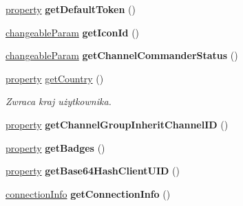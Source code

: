 \begin{DoxyCompactItemize}
\item 
\hyperlink{struct_ts3_api_1_1_client_1_1property}{property} {\bfseries get\+Default\+Token} ()\hypertarget{class_ts3_api_1_1_client_ae732cc011b882c77350de6ce99fbd3a0}{}\label{class_ts3_api_1_1_client_ae732cc011b882c77350de6ce99fbd3a0}

\item 
\hyperlink{struct_ts3_api_1_1_client_1_1changeable_param}{changeable\+Param} {\bfseries get\+Icon\+Id} ()\hypertarget{class_ts3_api_1_1_client_a130b1601b40d9e2062d767aa6c68c42d}{}\label{class_ts3_api_1_1_client_a130b1601b40d9e2062d767aa6c68c42d}

\item 
\hyperlink{struct_ts3_api_1_1_client_1_1changeable_param}{changeable\+Param} {\bfseries get\+Channel\+Commander\+Status} ()\hypertarget{class_ts3_api_1_1_client_a6387e63b888385926fee0c8c98fbdbde}{}\label{class_ts3_api_1_1_client_a6387e63b888385926fee0c8c98fbdbde}

\item 
\hyperlink{struct_ts3_api_1_1_client_1_1property}{property} \hyperlink{class_ts3_api_1_1_client_a7aea0d7be0c13772bf0cbcfe435d5b35}{get\+Country} ()\hypertarget{class_ts3_api_1_1_client_a7aea0d7be0c13772bf0cbcfe435d5b35}{}\label{class_ts3_api_1_1_client_a7aea0d7be0c13772bf0cbcfe435d5b35}

\begin{DoxyCompactList}\small\item\em Zwraca kraj użytkownika. \end{DoxyCompactList}\item 
\hyperlink{struct_ts3_api_1_1_client_1_1property}{property} {\bfseries get\+Channel\+Group\+Inherit\+Channel\+ID} ()\hypertarget{class_ts3_api_1_1_client_a7ca8f8068c190499d056c49496cdb2e8}{}\label{class_ts3_api_1_1_client_a7ca8f8068c190499d056c49496cdb2e8}

\item 
\hyperlink{struct_ts3_api_1_1_client_1_1property}{property} {\bfseries get\+Badges} ()\hypertarget{class_ts3_api_1_1_client_a13b167d84730f97ef069395d58bb2b24}{}\label{class_ts3_api_1_1_client_a13b167d84730f97ef069395d58bb2b24}

\item 
\hyperlink{struct_ts3_api_1_1_client_1_1property}{property} {\bfseries get\+Base64\+Hash\+Client\+U\+ID} ()\hypertarget{class_ts3_api_1_1_client_aea48dfe6fed2db31878bfb46093f315d}{}\label{class_ts3_api_1_1_client_aea48dfe6fed2db31878bfb46093f315d}

\item 
\hyperlink{struct_ts3_api_1_1_client_1_1connection_info}{connection\+Info} {\bfseries get\+Connection\+Info} ()\hypertarget{class_ts3_api_1_1_client_a59fb7b7c522625c35a1d1a8e7e125d5a}{}\label{class_ts3_api_1_1_client_a59fb7b7c522625c35a1d1a8e7e125d5a}


\end{DoxyCompactItemize}

